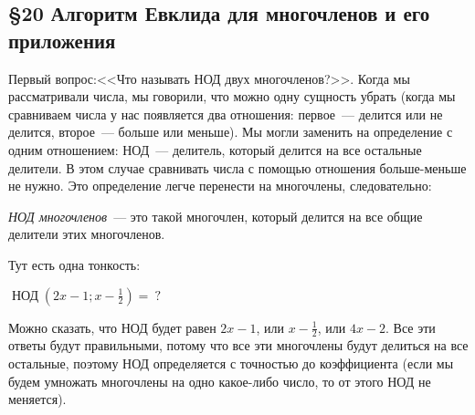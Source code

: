 \documentclass[russian]{lecture-notes}
\theoremstyle{definition}
\newcommand{\N}[2]{\mathop{\mbox{НОД}}(#1;#2)}
\begin{document}
    \begin{center}
        \section*{\LARGE\S 20 Алгоритм Евклида для многочленов и его приложения}
        \label{par:evklid}
    \end{center}

    Первый вопрос:<<Что называть НОД двух многочленов?>>. Когда мы рассматривали числа, мы говорили, что можно одну сущность убрать (когда мы сравниваем числа у нас появляется два отношения: первое~--- делится или не делится, второе~--- больше или меньше). Мы могли заменить на определение с одним отношением: НОД~--- делитель, который делится на все остальные делители. В этом случае сравнивать числа с помощью отношения больше-меньше не нужно. Это определение легче перенести на многочлены, следовательно:

    \emph{НОД многочленов}~--- это такой многочлен, который делится на все общие делители этих многочленов.

    Тут есть одна тонкость:
    \begin{example}
        $\N{2x - 1}{x - \frac{1}{2}} = \ ?$

        Можно сказать, что НОД будет равен $2x - 1$, или $x - \frac{1}{2}$, или $4x - 2$. Все эти ответы будут правильными, потому что все эти многочлены будут делиться на все остальные, поэтому НОД определяется с точностью до коэффициента (если мы будем умножать многочлены на одно какое-либо число, то от этого НОД не меняется).
    \end{example}
\end{document}

